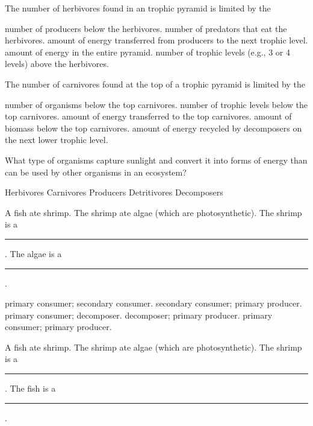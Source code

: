 \question
The number of herbivores found in an trophic pyramid is limited by the

\begin{choices}
\choice number of producers below the herbivores.%
\choice number of predators that eat the herbivores.%
\correctchoice amount of energy transferred from producers to the next trophic level.%
\choice amount of energy in the entire pyramid.%
\choice number of trophic levels (e.g., 3 or 4 levels) above the herbivores.%
\end{choices}


\question
The number of carnivores found at the top of a trophic pyramid is limited by the

\begin{choices}
\choice number of organisms below the top carnivores. %
\choice number of trophic levels below the top carnivores. %
\correctchoice amount of energy transferred to the top carnivores. %
\choice amount of biomass below the top carnivores. %
\choice amount of energy recycled by decomposers on the next lower trophic level. %
\end{choices}

\question
What type of organisms capture sunlight and convert it into forms of energy than can be used by other organisms in an ecosystem?

\begin{choices}
\choice Herbivores %
\choice Carnivores %
\correctchoice Producers %
\choice Detritivores %
\choice Decomposers %
\end{choices}

\question
A fish ate shrimp. The shrimp ate algae (which are photosynthetic).  The shrimp is a \rule{1in}{0.4pt}. The algae is a \rule{1in}{0.4pt}.

\begin{choices}	
\choice primary consumer; secondary consumer. %
\choice secondary consumer; primary producer. %
\choice primary consumer; decomposer. %
\choice decomposer; primary producer. %
\correctchoice primary consumer; primary producer. %
\end{choices}

\question
A fish ate shrimp. The shrimp ate algae (which are photosynthetic).  The shrimp is a \rule{1in}{0.4pt}. The fish is a \rule{1in}{0.4pt}.

